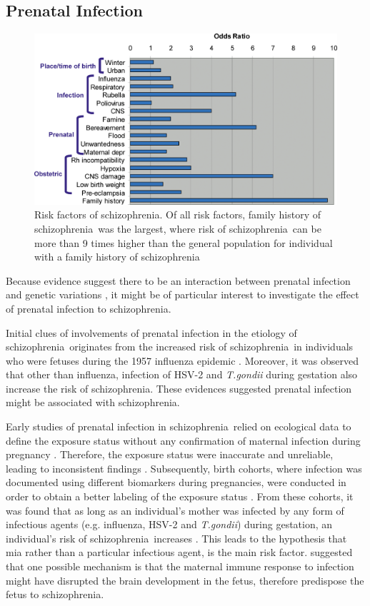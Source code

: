 \documentclass[12pt]{scrbook}
\newcommand*{\scz}{schizophrenia}
\begin{document}
\subsection{Prenatal Infection}
\begin{figure}
	\centering
	\includegraphics[width=\textwidth]{figure/risk_factors_of_schizophrenia.png}
	\caption[Risk factors of \scz]{Risk factors of \scz.
		Of all risk factors, family history of \scz\ was the largest, where risk of \scz\ can be more than 9 times higher than the general population for individual with a family history of \scz\ \citep{Sullivan2005}}
	\label{fig:riskfactors}
\end{figure}

Because evidence suggest there to be an interaction between prenatal infection and genetic variations \citep{Clarke2009}, it might be of particular interest to investigate the effect of prenatal infection to \scz.

Initial clues of involvements of prenatal infection in the etiology of \scz\ originates from the increased risk of \scz\ in individuals who were fetuses during the 1957 influenza epidemic \citep{Mednick1958}.
Moreover, it was observed that other than influenza, infection of HSV-2 and \textit{T.gondii} during gestation also increase the risk of \scz\citep{Brown2010}.
These evidences suggested prenatal infection might be associated with \scz.

Early studies of prenatal infection in \scz\ relied on ecological data to define the exposure status without any confirmation of maternal infection during pregnancy \citep{Brown2010}.
Therefore, the exposure status were inaccurate and unreliable, leading to inconsistent findings \citep{Brown2010}.  
Subsequently, birth cohorts, where infection was documented using different biomarkers during pregnancies, were conducted in order to obtain a better labeling of the exposure status \citep{Brown2010}.
From these cohorts, it was found that as long as an individual's mother was infected by any form of infectious agents (e.g. influenza, HSV-2 and \textit{T.gondii}) during gestation, an individual's risk of \scz\ increases \citep{Brown2010}.
This leads to the hypothesis that \gls{mia} \citep{Brown2010} rather than a particular infectious agent, is the main risk factor. 
\citet{Garbett2012a} suggested that one possible mechanism is that the maternal immune response to infection might have disrupted the brain development in the fetus, therefore predispose the fetus to \scz.
\end{document}
